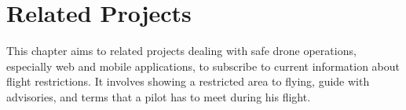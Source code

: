 \chapter{Related Projects}\label{ch:related-projects}
This chapter aims to related projects dealing with safe drone operations, especially web and mobile applications, to subscribe to current information about flight restrictions.
It involves showing a restricted area to flying, guide with advisories, and terms that a pilot has to meet during his flight.












